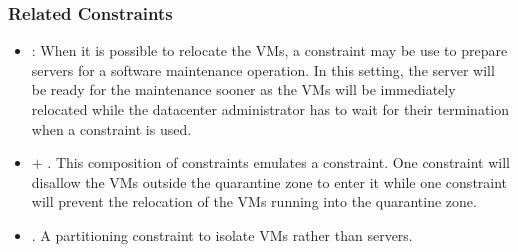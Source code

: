 \subsubsection{Related Constraints}
\begin{itemize}
\item {}: When it is possible to relocate the VMs, a  constraint may be use to prepare servers for a software maintenance operation. In this setting, the server will be ready for the maintenance sooner as the VMs will be immediately relocated while the datacenter administrator has to wait for their termination when a  constraint is used.

\item {} $+$ . This composition of constraints
emulates a  constraint. One  constraint will disallow the VMs outside the quarantine zone to enter it while one  constraint will prevent the relocation of the VMs running into the quarantine zone.

\item {}. A partitioning constraint to isolate VMs rather than servers.
\end{itemize}

